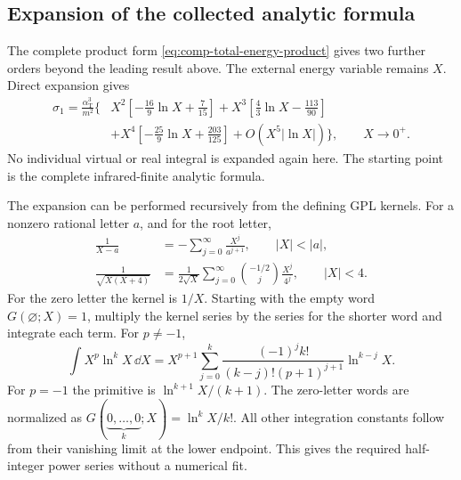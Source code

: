 \subsection{Expansion of the collected analytic formula}
\label{sec:comp-total-energy-low}
The complete product form \eqref{eq:comp-total-energy-product} gives
two further orders beyond the leading result above. The external energy variable remains $X$.
Direct expansion gives
\begin{equation}
\begin{aligned}
 \sigma_1=\frac{\alpha_{\mathrm T}^3}{m^2}\biggl\{
 &X^2\left[-\frac{16}{9}\ln X+\frac7{15}\right]
 +X^3\left[\frac43\ln X-\frac{113}{90}\right]\\
 &+X^4\left[-\frac{25}{9}\ln X+\frac{203}{125}\right]
 +O\!\left(X^5|\ln X|\right)\biggr\},\qquad X\to0^+.
\end{aligned}
\label{eq:comp-collected-total-low-four}
\end{equation}
No individual virtual or real integral is expanded again here. The
starting point is the complete infrared-finite analytic formula.

The expansion can be performed recursively from the defining GPL
kernels. For a nonzero rational letter $a$, and for the root letter,
\begin{align}
 \frac1{X-a}&=-\sum_{j=0}^{\infty}\frac{X^j}{a^{j+1}},
                      \qquad |X|<|a|,\\
 \frac1{\sqrt{X(X+4)}}
 &=\frac1{2\sqrt X}\sum_{j=0}^{\infty}
       \binom{-1/2}{j}\frac{X^j}{4^j},\qquad |X|<4.
\end{align}
For the zero letter the kernel is $1/X$. Starting with the empty
word $G(\varnothing;X)=1$, multiply the kernel series by the series
for the shorter word and integrate each term. For $p\ne-1$,
\begin{equation}
 \int X^p\ln^k X\,\dd X
 =X^{p+1}\sum_{j=0}^{k}
       \frac{(-1)^j k!}{(k-j)!(p+1)^{j+1}}\ln^{k-j}X.
\end{equation}
For $p=-1$ the primitive is $\ln^{k+1}X/(k+1)$.
The zero-letter words are normalized as
$G(\underbrace{0,\ldots,0}_{k};X)=\ln^k X/k!$.
All other integration constants follow from their vanishing limit at
the lower endpoint. This gives the required half-integer power series
without a numerical fit.

